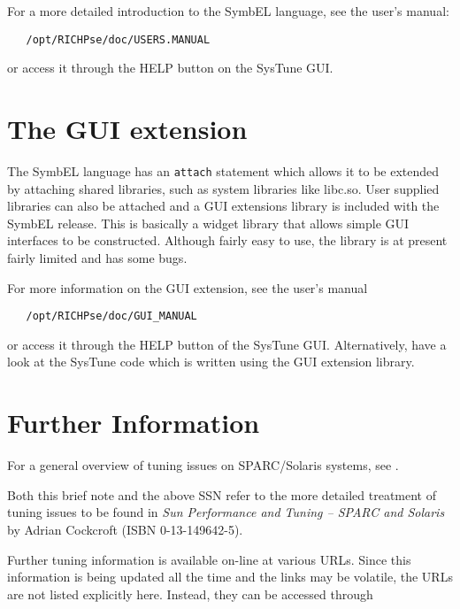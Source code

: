 For a more detailed introduction to the SymbEL language, see the user's
manual:

\begin{verbatim}
   /opt/RICHPse/doc/USERS.MANUAL
\end{verbatim}

or access it through the HELP button on the SysTune GUI.
 
\section{\label{gui}The GUI extension}

The SymbEL language has an {\tt{attach}} statement which allows it to be
extended by attaching shared libraries, such as system libraries like
libc.so. User supplied libraries can also be attached and a GUI extensions
library is included with the SymbEL release. This is basically a widget
library that allows simple GUI interfaces to be constructed. Although
fairly easy to use, the library is at present fairly limited and has some
bugs.

For more information on the GUI extension, see the user's manual

\begin{verbatim}
   /opt/RICHPse/doc/GUI_MANUAL
\end{verbatim}

or access it through the HELP button of the SysTune GUI. Alternatively,
have a look at the SysTune code which is written using the GUI extension
library.

\section{\label{more_info}Further Information}

For a general overview of tuning issues on SPARC/Solaris systems, see
.

Both this brief note and the above SSN refer to the more detailed treatment
of tuning issues to be found in {\em{Sun Performance and Tuning -- SPARC and
Solaris}} by Adrian Cockcroft (ISBN 0-13-149642-5).

Further tuning information is available on-line at various URLs. Since
this information is being updated all the time and the links may be
volatile, the URLs are not listed explicitly here. Instead, they can be
accessed through 

